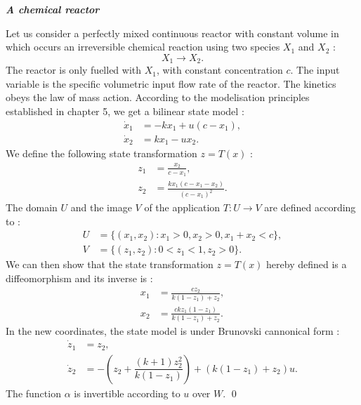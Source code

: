 \begin{exemple}{\bf \em A chemical reactor \label{exreachim} }
 
Let us consider a perfectly mixed continuous reactor with constant volume in which occurs an irreversible chemical reaction using two species $X_1$ and $X_2$ :
 $$
 X_1 \longrightarrow X_2.
 $$
 The reactor is only fuelled with $X_1$, with constant concentration
 $c$.  The input variable is the specific volumetric input flow rate of the reactor. The kinetics obeys the law of mass action. According to the modelisation principles established in chapter 5, we get a bilinear state model :
 \begin{equation*} \begin{split}
 \dot x_1 &= -kx_1 + u (c-x_1),\\
 \dot x_2 &= kx_1 - ux_2.
 \end{split} \end{equation*}
 We define the following state transformation $z = T(x)$ :
 \begin{equation*} \begin{split}
 z_1 &= \frac{x_2}{c-x_1},\\
 z_2 &= \frac{kx_1(c-x_1-x_2)}{(c-x_1)^2}.
 \end{split} \end{equation*}
 The domain $U$ and the image $V$ of the application $T : U \longrightarrow V$
 are defined according to :
 \begin{equation*} \begin{split}
 U &= \{(x_1, x_2) : x_1 > 0, x_2 > 0, x_1+x_2 < c \},\\
 V &= \{(z_1,z_2) : 0<z_1 <1, z_2>0 \}.
 \end{split} \end{equation*}
We can then show that the state transformation $z = T(x)$ hereby defined is a diffeomorphism and its inverse is :
 \begin{equation*} \begin{split} 
 x_1 &= \frac{cz_2}{k(1-z_1)+z_2},\\
 x_2 &= \frac{ckz_1(1-z_1)}{k(1-z_1)+z_2}.
 \end{split} \end{equation*}
 In the new coordinates, the state model is under Brunovski cannonical form :
 \begin{equation*} \begin{split} 
 \dot z_1 &= z_2,\\
 \dot z_2 &= -\left( z_2 + \dfrac{(k+1)z^2_2}{k(1-z_1)} \right) + (k(1-z_1) + z_2)u.
 \end{split} \end{equation*} 
The function $\alpha$ is invertible according to $u$ over $W$. \qed
\end{exemple}

